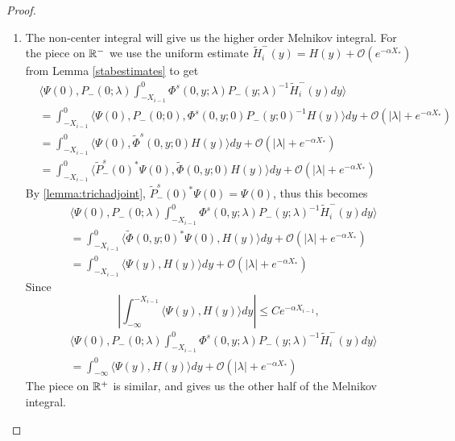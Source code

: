 \documentclass[thesis.tex]{subfiles}
\begin{document}
\begin{lemma}
\begin{proof}
\begin{enumerate}
\item The non-center integral will give us the higher order Melnikov integral. For the piece on $\mathbb{R}^-$ we use the uniform estimate $\tilde{H}_i^-(y) = H(y) + \mathcal{O}(e^{-\alpha X_*})$ from Lemma \ref{stabestimates} to get
\begin{align*}
&\langle \Psi(0), P_-(0; \lambda) \int_{-X_{i-1}}^0 \Phi^s(0, y; \lambda) P_-(y; \lambda)^{-1} \tilde{H}_i^-(y) dy \rangle \\
&= \int_{-X_{i-1}}^0 \langle \Psi(0), P_-(0; 0), \Phi^s(0, y; 0) P_-(y; 0)^{-1} H(y) \rangle dy + \mathcal{O}(|\lambda| + {e^{-\alpha X_*}}) \\
&= \int_{-X_{i-1}}^0 \langle \Psi(0), \tilde{\Phi}^s(0, y; 0) H(y) \rangle dy + \mathcal{O}(|\lambda| + {e^{-\alpha X_*}}) \\
&= \int_{-X_{i-1}}^0 \langle \tilde{P}_-^s(0)^*\Psi(0), \tilde{\Phi}(0, y; 0) H(y) \rangle dy + \mathcal{O}(|\lambda| + {e^{-\alpha X_*}})
\end{align*}
By \ref{lemma:trichadjoint}, $\tilde{P}_-^s(0)^*\Psi(0) = \Psi(0)$, thus this becomes
\begin{align*}
&\langle \Psi(0), P_-(0; \lambda) \int_{-X_{i-1}}^0 \Phi^s(0, y; \lambda) P_-(y; \lambda)^{-1} \tilde{H}_i^-(y) dy \rangle \\
&= \int_{-X_{i-1}}^0 \langle \tilde{\Phi}(0, y; 0) ^* \Psi(0), H(y) \rangle dy + \mathcal{O}(|\lambda| + {e^{-\alpha X_*}}) \\
&= \int_{-X_{i-1}}^0 \langle \Psi(y), H(y) \rangle dy + \mathcal{O}(|\lambda| + {e^{-\alpha X_*}})
\end{align*}
Since 
\[
\left| \int_{-\infty}^{-X_{i-1}} \langle \Psi(y), H(y) \rangle dy \right| \leq C e^{-\alpha X_{i-1}},
\]
\begin{align*}
&\langle \Psi(0), P_-(0; \lambda) \int_{-X_{i-1}}^0 \Phi^s(0, y; \lambda) P_-(y; \lambda)^{-1} \tilde{H}_i^-(y) dy \rangle \\
&= \int_{-\infty}^0 \langle \Psi(y), H(y) \rangle dy + \mathcal{O}(|\lambda| + {e^{-\alpha X_*}})
\end{align*}
The piece on $\mathbb{R}^+$ is similar, and gives us the other half of the Melnikov integral.


\end{enumerate}
\end{proof}
\end{lemma}
\end{document}
